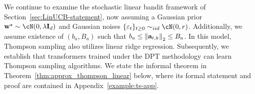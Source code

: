 We continue to examine the stochastic linear bandit framework of Section~\ref{sec:LinUCB-statement}, now assuming a Gaussian prior $\bw^\star\sim \cN(0,\Tpspar\id_d)$ and Gaussian noises $\{ \eps_t \}_{t \ge 0} \sim_{iid} \cN(0,\Tpsparn)$. Additionally, we assume existence of $(b_a, B_a)$ such that $b_a\leq\left\|{{\mathbf a}_{t,k}}\right\|_2\leq B_a$. In this model, Thompson sampling also utilizes linear ridge regression. Subsequently, we establish that transformers trained under the DPT methodology can learn Thompson sampling algorithms. We state the informal theorem in Theorem~\ref{thm:approx_thompson_linear} below, where its formal statement and proof are contained in Appendix~\ref{example:ts-app}. 



